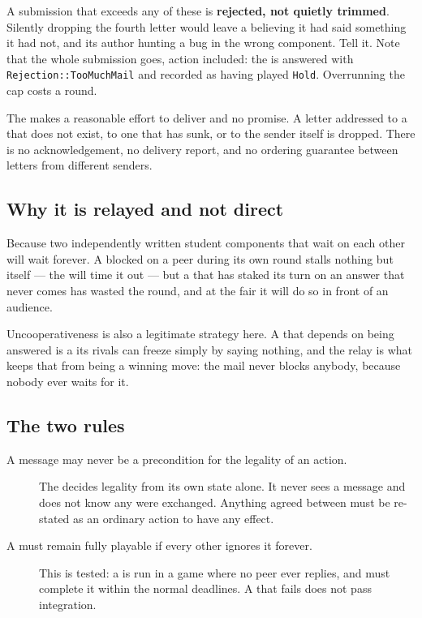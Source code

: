 \documentclass{article}
\begin{document}
A submission that exceeds any of these is \textbf{rejected, not quietly trimmed}. Silently dropping
the fourth letter would leave a \ship{} believing it had said something it had not, and its author
hunting a bug in the wrong component. Tell it. Note that the whole submission goes, action
included: the \ship{} is answered with \texttt{Rejection::TooMuchMail} and recorded as having
played \texttt{Hold}. Overrunning the cap costs a round.

The \admiralty{} makes a reasonable effort to deliver and no promise. A letter addressed to a
\ship{} that does not exist, to one that has sunk, or to the sender itself is dropped. There is no
acknowledgement, no delivery report, and no ordering guarantee between letters from different
senders.

\subsection{Why it is relayed and not direct}

Because two independently written student components that wait on each other will wait forever. A
\ship{} blocked on a peer during its own round stalls nothing but itself --- the \admiralty{} will
time it out --- but a \ship{} that has staked its turn on an answer that never comes has wasted the
round, and at the fair it will do so in front of an audience.

Uncooperativeness is also a legitimate strategy here. A \ship{} that depends on being answered is a
\ship{} its rivals can freeze simply by saying nothing, and the relay is what keeps that from being
a winning move: the mail never blocks anybody, because nobody ever waits for it.

\subsection{The two rules}

\begin{description}
    \item[A message may never be a precondition for the legality of an action.] The \chart{}
      decides legality from its own state alone. It never sees a message and does not know any were
      exchanged. Anything agreed between \ships must be re-stated as an ordinary action to have any
      effect.
    \item[A \ship{} must remain fully playable if every other \ship{} ignores it forever.] This is
      tested: a \ship{} is run in a game where no peer ever replies, and must complete it within the
      normal deadlines. A \ship{} that fails does not pass integration.
\end{description}
\end{document}

